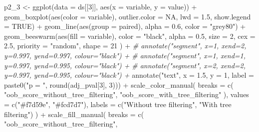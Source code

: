 \documentclass[
  11pt,
  oneside]{book}
\newenvironment{Shaded}{\begin{snugshade}}{\end{snugshade}}
\newcommand{\AttributeTok}[1]{\textcolor[rgb]{0.77,0.63,0.00}{#1}}
\newcommand{\CommentTok}[1]{\textcolor[rgb]{0.56,0.35,0.01}{\textit{#1}}}
\newcommand{\ConstantTok}[1]{\textcolor[rgb]{0.00,0.00,0.00}{#1}}
\newcommand{\DecValTok}[1]{\textcolor[rgb]{0.00,0.00,0.81}{#1}}
\newcommand{\FloatTok}[1]{\textcolor[rgb]{0.00,0.00,0.81}{#1}}
\newcommand{\FunctionTok}[1]{\textcolor[rgb]{0.00,0.00,0.00}{#1}}
\newcommand{\NormalTok}[1]{#1}
\newcommand{\OtherTok}[1]{\textcolor[rgb]{0.56,0.35,0.01}{#1}}
\newcommand{\SpecialCharTok}[1]{\textcolor[rgb]{0.00,0.00,0.00}{#1}}
\newcommand{\StringTok}[1]{\textcolor[rgb]{0.31,0.60,0.02}{#1}}
\begin{document}
\begin{Shaded}
\begin{Highlighting}[]
\NormalTok{p2\_3 }\OtherTok{\textless{}{-}} \FunctionTok{ggplot}\NormalTok{(}\AttributeTok{data =}\NormalTok{ ds[[}\DecValTok{3}\NormalTok{]], }\FunctionTok{aes}\NormalTok{(}\AttributeTok{x =}\NormalTok{ variable, }\AttributeTok{y =}\NormalTok{ value)) }\SpecialCharTok{+}
  \FunctionTok{geom\_boxplot}\NormalTok{(}\FunctionTok{aes}\NormalTok{(}\AttributeTok{color =}\NormalTok{ variable), }\AttributeTok{outlier.color =} \ConstantTok{NA}\NormalTok{, }\AttributeTok{lwd =} \FloatTok{1.5}\NormalTok{, }\AttributeTok{show.legend =} \ConstantTok{TRUE}\NormalTok{) }\SpecialCharTok{+}
  \FunctionTok{geom\_line}\NormalTok{(}\FunctionTok{aes}\NormalTok{(}\AttributeTok{group =}\NormalTok{ paired), }\AttributeTok{alpha =} \FloatTok{0.6}\NormalTok{, }\AttributeTok{color =} \StringTok{"grey80"}\NormalTok{) }\SpecialCharTok{+}
  \FunctionTok{geom\_beeswarm}\NormalTok{(}\FunctionTok{aes}\NormalTok{(}\AttributeTok{fill =}\NormalTok{ variable),}
    \AttributeTok{color =} \StringTok{"black"}\NormalTok{, }\AttributeTok{alpha =} \FloatTok{0.5}\NormalTok{, }\AttributeTok{size =} \DecValTok{2}\NormalTok{, }\AttributeTok{cex =} \FloatTok{2.5}\NormalTok{, }\AttributeTok{priority =} \StringTok{"random"}\NormalTok{,}
    \AttributeTok{shape =} \DecValTok{21}
\NormalTok{  ) }\SpecialCharTok{+}
  \CommentTok{\# annotate("segment", x=1, xend=2, y=0.997, yend=0.997, colour="black") +}
  \CommentTok{\# annotate("segment", x=1, xend=1, y=0.997, yend=0.995, colour="black") +}
  \CommentTok{\# annotate("segment", x=2, xend=2, y=0.997, yend=0.995, colour="black") +}
  \FunctionTok{annotate}\NormalTok{(}\StringTok{"text"}\NormalTok{, }\AttributeTok{x =} \FloatTok{1.5}\NormalTok{, }\AttributeTok{y =} \DecValTok{1}\NormalTok{, }\AttributeTok{label =} \FunctionTok{paste0}\NormalTok{(}\StringTok{"p = "}\NormalTok{, }\FunctionTok{round}\NormalTok{(adj\_pval[}\DecValTok{3}\NormalTok{], }\DecValTok{3}\NormalTok{))) }\SpecialCharTok{+}
  \FunctionTok{scale\_color\_manual}\NormalTok{(}
    \AttributeTok{breaks =} \FunctionTok{c}\NormalTok{(}
      \StringTok{"oob\_score\_without\_tree\_filtering"}\NormalTok{,}
      \StringTok{"oob\_score\_with\_tree\_filtering"}
\NormalTok{    ),}
    \AttributeTok{values =} \FunctionTok{c}\NormalTok{(}\StringTok{"\#f7d59e"}\NormalTok{, }\StringTok{"\#fcd7d7"}\NormalTok{),}
    \AttributeTok{labels =} \FunctionTok{c}\NormalTok{(}\StringTok{"Without tree filtering"}\NormalTok{, }\StringTok{"With tree filtering"}\NormalTok{)}
\NormalTok{  ) }\SpecialCharTok{+}
  \FunctionTok{scale\_fill\_manual}\NormalTok{(}
    \AttributeTok{breaks =} \FunctionTok{c}\NormalTok{(}
      \StringTok{"oob\_score\_without\_tree\_filtering"}\NormalTok{,}

\end{Highlighting}
\end{Shaded}
\end{document}

